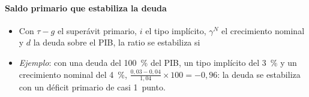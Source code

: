 \documentclass[11pt]{article}
\begin{document}
\paragraph{Saldo primario que estabiliza la deuda}
\begin{itemize}
\item Con $\tau-g$ el superávit primario, $i$ el tipo implícito, $\gamma^N$ el crecimiento nominal y $d$ la deuda sobre el PIB, la ratio se estabiliza si
\item \emph{Ejemplo}: con una deuda del 100~\% del PIB, un tipo implícito del 3~\% y un crecimiento nominal del 4~\%, $\frac{0{,}03-0{,}04}{1{,}04}\times100=-0{,}96$: la deuda se estabiliza con un déficit primario de casi 1~punto.
\end{itemize}
\end{document}
